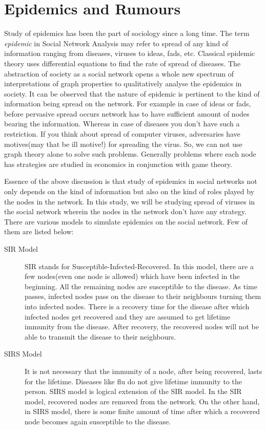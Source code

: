 \documentclass[12pt]{article}
\begin{document}
\section{Epidemics and Rumours}
Study of epidemics has been the part of sociology since a long time. The term {\it epidemic} in Social Network Analysis may refer to spread of any kind of information ranging from diseases, viruses to ideas, fads, etc. Classical epidemic theory uses differential equations to find the rate of spread of diseases. The abstraction of society as a social network opens a whole new spectrum of interpretations of graph properties to qualitatively analyse the epidemics in society\cite{keeling}. It can be observed that the nature of epidemic is pertinent to the kind of information being spread on the network. For example in case of ideas or fads, before pervasive spread occurs network has to have sufficient amount of nodes bearing the information. Whereas in case of diseases you don't have such a restriction. If you think about spread of computer viruses, adversaries have motives(may that be ill motive!) for spreading the virus. So, we can not use graph theory alone to solve such problems. Generally problems where each node has strategies are studied in economics in conjunction with game theory.
\par Essence of the above discussion is that study of epidemics in social networks not only depends on the kind of information but also on the kind of roles played by the nodes in the network. In this study, we will be studying spread of viruses in the social network wherein the nodes in the network don't have any strategy. There are various models to simulate epidemics on the social network\cite{crowds}. Few of them are listed below:
\begin{description}
	\item[SIR Model]
	SIR stands for Susceptible-Infected-Recovered. In this model, there are a few nodes(even one node is allowed) which have been infected in the beginning. All the remaining nodes are susceptible to the disease. As time passes, infected nodes pass on the disease to their neighbours turning them into infected nodes. There is a recovery time for the disease after which infected nodes get recovered and they are assumed to get lifetime immunity from the disease. After recovery, the recovered nodes will not be able to transmit the disease to their neighbours.
	\item[SIRS Model]
	It is not necessary that the immunity of a node, after being recovered, lasts for the lifetime. Diseases like flu do not give lifetime immunity to the person. SIRS model is logical extension of the SIR model. In the SIR model, recovered nodes are removed from the network. On the other hand, in SIRS model, there is some finite amount of time after which a recovered node becomes again susceptible to the disease.
\end{description}
\end{document}
